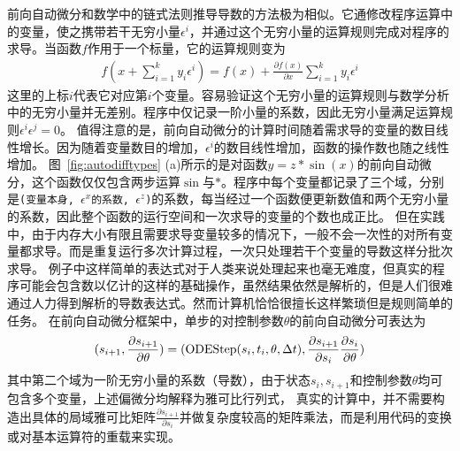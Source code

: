 \documentclass[A4,twoside,fontset=ubuntu,UTF8]{ctexart}
\begin{document}
前向自动微分和数学中的链式法则推导导数的方法极为相似。它通修改程序运算中的变量，使之携带若干无穷小量$\epsilon^i$，并通过这个无穷小量的运算规则完成对程序的求导。当函数$f$作用于一个标量，它的运算规则变为
\begin{align}
    f(x+\sum\limits^k_{i=1} y_i \epsilon^i) = f(x) + \frac{\partial f(x)}{\partial x} \sum\limits^k_{i=1}y_i\epsilon^i
\end{align}
这里的上标$i$代表它对应第$i$个变量。容易验证这个无穷小量的运算规则与数学分析中的无穷小量并无差别。程序中仅记录一阶小量的系数，因此无穷小量满足运算规则$\epsilon^i\epsilon^j = 0$。
值得注意的是，前向自动微分的计算时间随着需求导的变量的数目线性增长。因为随着变量数目的增加，$\epsilon^i$的数目线性增加，函数的操作数也随之线性增加。
图~\ref{fig:autodifftypes} (a)所示的是对函数$y=z *\sin(x)$的前向自动微分，这个函数仅仅包含两步运算$\sin$与$*$。程序中每个变量都记录了三个域，分别是\texttt{(变量本身, $\epsilon^x$的系数, $\epsilon^z$)}的系数，每当经过一个函数便更新数值和两个无穷小量的系数，因此整个函数的运行空间和一次求导的变量的个数也成正比。
但在实践中，由于内存大小有限且需要求导变量较多的情况下，一般不会一次性的对所有变量都求导。而是重复运行多次计算过程，一次只处理若干个变量的导数这样分批次求导。
例子中这样简单的表达式对于人类来说处理起来也毫无难度，但真实的程序可能会包含数以亿计的这样的基础操作，虽然结果依然是解析的，但是人们很难通过人力得到解析的导数表达式。然而计算机恰恰很擅长这样繁琐但是规则简单的任务。
在前向自动微分框架中，单步的对控制参数$\theta$的前向自动微分可表达为
$$(s_{i+1}, \frac{\partial s_{i+1}}{\partial \theta}) = ({\rm ODEStep}(s_{i}, t_i, \theta, \Delta t), \frac{\partial s_{i+1}}{\partial s_i} \frac{\partial s_{i}}{\partial \theta})$$
其中第二个域为一阶无穷小量的系数（导数），由于状态$s_i, s_{i+1}$和控制参数$\theta$均可包含多个变量，上述偏微分均解释为雅可比行列式，
真实的计算中，并不需要构造出具体的局域雅可比矩阵$\frac{\partial s_{i+1}}{\partial s_i}$并做复杂度较高的矩阵乘法，而是利用代码的变换或对基本运算符的重载来实现。
\end{document}
